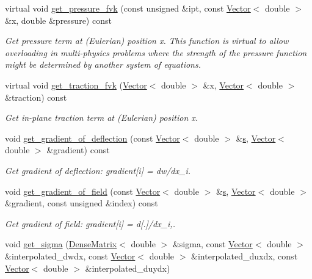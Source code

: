 \begin{DoxyCompactItemize}
virtual void \hyperlink{classoomph_1_1DisplacementBasedFoepplvonKarmanEquations_adf1849b94ae0a98459a02405cde57a1c}{get\+\_\+pressure\+\_\+fvk} (const unsigned \&ipt, const \hyperlink{classoomph_1_1Vector}{Vector}$<$ double $>$ \&x, double \&pressure) const
\begin{DoxyCompactList}\small\item\em Get pressure term at (Eulerian) position x. This function is virtual to allow overloading in multi-\/physics problems where the strength of the pressure function might be determined by another system of equations. \end{DoxyCompactList}\item 
virtual void \hyperlink{classoomph_1_1DisplacementBasedFoepplvonKarmanEquations_afd044e54b959f0238ec8724ea529fbd6}{get\+\_\+traction\+\_\+fvk} (\hyperlink{classoomph_1_1Vector}{Vector}$<$ double $>$ \&x, \hyperlink{classoomph_1_1Vector}{Vector}$<$ double $>$ \&traction) const
\begin{DoxyCompactList}\small\item\em Get in-\/plane traction term at (Eulerian) position x. \end{DoxyCompactList}\item 
void \hyperlink{classoomph_1_1DisplacementBasedFoepplvonKarmanEquations_a96188696e059a5a74172be73756f8f27}{get\+\_\+gradient\+\_\+of\+\_\+deflection} (const \hyperlink{classoomph_1_1Vector}{Vector}$<$ double $>$ \&\hyperlink{cfortran_8h_ab7123126e4885ef647dd9c6e3807a21c}{s}, \hyperlink{classoomph_1_1Vector}{Vector}$<$ double $>$ \&gradient) const
\begin{DoxyCompactList}\small\item\em Get gradient of deflection\+: gradient\mbox{[}i\mbox{]} = dw/dx\+\_\+i. \end{DoxyCompactList}\item 
void \hyperlink{classoomph_1_1DisplacementBasedFoepplvonKarmanEquations_a7f0e08691ebe9a34bfd95d6f2c38558f}{get\+\_\+gradient\+\_\+of\+\_\+field} (const \hyperlink{classoomph_1_1Vector}{Vector}$<$ double $>$ \&\hyperlink{cfortran_8h_ab7123126e4885ef647dd9c6e3807a21c}{s}, \hyperlink{classoomph_1_1Vector}{Vector}$<$ double $>$ \&gradient, const unsigned \&index) const
\begin{DoxyCompactList}\small\item\em Get gradient of field\+: gradient\mbox{[}i\mbox{]} = d\mbox{[}.\mbox{]}/dx\+\_\+i,. \end{DoxyCompactList}\item 
void \hyperlink{classoomph_1_1DisplacementBasedFoepplvonKarmanEquations_ad1f40f34ceb5c97eed8dbc12cc414044}{get\+\_\+sigma} (\hyperlink{classoomph_1_1DenseMatrix}{Dense\+Matrix}$<$ double $>$ \&sigma, const \hyperlink{classoomph_1_1Vector}{Vector}$<$ double $>$ \&interpolated\+\_\+dwdx, const \hyperlink{classoomph_1_1Vector}{Vector}$<$ double $>$ \&interpolated\+\_\+duxdx, const \hyperlink{classoomph_1_1Vector}{Vector}$<$ double $>$ \&interpolated\+\_\+duydx)

\end{DoxyCompactItemize}
